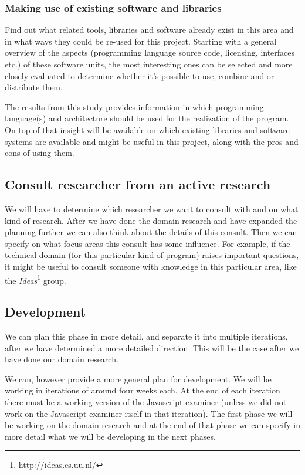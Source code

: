 \documentclass{article}
\begin{document}
\subsubsection{Making use of existing software and libraries}
Find out what related tools, libraries and software already exist in this area
and in what ways they could be re-used for this project. Starting with a
general overview of the aspects (programming language source code, licensing,
interfaces etc.) of these software units, the most interesting ones can be
selected and more closely evaluated to determine whether it's possible to use,
combine and or distribute them.

The results from this study provides information in which programming
language(s) and architecture should be used for the realization of the
program. On top of that insight will be available on which existing libraries
and software systems are available and might be useful in this project, along
with the pros and cons of using them.

\subsection{Consult researcher from an active research}
We will have to determine which researcher we want to consult with and on what
kind of research. After we have done the domain research and have expanded the
planning further we can also think about the details of this consult. Then we
can specify on what focus areas this consult has some influence. For example,
if the technical domain (for this particular kind of program) raises important
questions, it might be useful to consult someone with knowledge in this
particular area, like the {\em Ideas}\footnote{http://ideas.cs.uu.nl/} group.

\subsection{Development}
We can plan this phase in more detail, and separate it into multiple iterations,
after we have determined a more detailed direction. This will be the case after
we have done our domain research.

We can, however provide a more general plan for development. We will be working
in iterations of around four weeks each. At the end of each iteration there must be a
working version of the Javascript examiner (unless we did not work on the
Javascript examiner itself in that iteration). The first phase we will be working
on the domain research and at the end of that phase we can specify in more
detail what we will be developing in the next phases.
\end{document}
